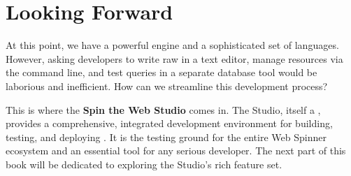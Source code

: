\section{Looking Forward}
\label{sec:webspinner-forward}

At this point, we have a powerful engine and a sophisticated set of languages. However, asking developers to write raw \wbdl{} in a text editor, manage resources via the command line, and test queries in a separate database tool would be laborious and inefficient. How can we streamline this development process?

This is where the \textbf{Spin the Web Studio} comes in. The Studio, itself a \webbaselet{}, provides a comprehensive, integrated development environment for building, testing, and deploying . It is the testing ground for the entire Web Spinner ecosystem and an essential tool for any serious developer. The next part of this book will be dedicated to exploring the Studio's rich feature set.
